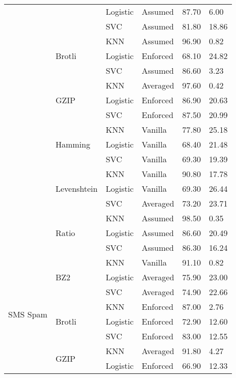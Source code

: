 \begin{tabularx}{\textwidth}{llllll}
\cline{3-6}
 &  & Logistic & Assumed & 87.70 & 6.00 \\
\cline{3-6}
 &  & SVC & Assumed & 81.80 & 18.86 \\
\cline{2-6} \cline{3-6}
 & \multirow[t]{3}{*}{Brotli} & KNN & Assumed & 96.90 & 0.82 \\
\cline{3-6}
 &  & Logistic & Enforced & 68.10 & 24.82 \\
\cline{3-6}
 &  & SVC & Assumed & 86.60 & 3.23 \\
\cline{2-6} \cline{3-6}
 & \multirow[t]{3}{*}{GZIP} & KNN & Averaged & 97.60 & 0.42 \\
\cline{3-6}
 &  & Logistic & Enforced & 86.90 & 20.63 \\
\cline{3-6}
 &  & SVC & Enforced & 87.50 & 20.99 \\
\cline{2-6} \cline{3-6}
 & \multirow[t]{3}{*}{Hamming} & KNN & Vanilla & 77.80 & 25.18 \\
\cline{3-6}
 &  & Logistic & Vanilla & 68.40 & 21.48 \\
\cline{3-6}
 &  & SVC & Vanilla & 69.30 & 19.39 \\
\cline{2-6} \cline{3-6}
 & \multirow[t]{3}{*}{Levenshtein} & KNN & Vanilla & 90.80 & 17.78 \\
\cline{3-6}
 &  & Logistic & Vanilla & 69.30 & 26.44 \\
\cline{3-6}
 &  & SVC & Averaged & 73.20 & 23.71 \\
\cline{2-6} \cline{3-6}
 & \multirow[t]{3}{*}{Ratio} & KNN & Assumed & 98.50 & 0.35 \\
\cline{3-6}
 &  & Logistic & Assumed & 86.60 & 20.49 \\
\cline{3-6}
 &  & SVC & Assumed & 86.30 & 16.24 \\
\cline{1-6} \cline{2-6} \cline{3-6}
\multirow[t]{18}{*}{SMS Spam} & \multirow[t]{3}{*}{BZ2} & KNN & Vanilla & 91.10 & 0.82 \\
\cline{3-6}
 &  & Logistic & Averaged & 75.90 & 23.00 \\
\cline{3-6}
 &  & SVC & Averaged & 74.90 & 22.66 \\
\cline{2-6} \cline{3-6}
 & \multirow[t]{3}{*}{Brotli} & KNN & Enforced & 87.00 & 2.76 \\
\cline{3-6}
 &  & Logistic & Enforced & 72.90 & 12.60 \\
\cline{3-6}
 &  & SVC & Enforced & 83.00 & 12.55 \\
\cline{2-6} \cline{3-6}
 & \multirow[t]{3}{*}{GZIP} & KNN & Averaged & 91.80 & 4.27 \\
\cline{3-6}
 &  & Logistic & Enforced & 66.90 & 12.33 \\

\end{tabularx}
